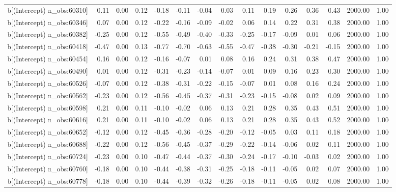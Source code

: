 \begin{table}[ht]
\begin{tabular}{rrrrrrrrrrrrrrr}
  b[(Intercept) n\_obs:60310] & 0.11 & 0.00 & 0.12 & -0.18 & -0.11 & -0.04 & 0.03 & 0.11 & 0.19 & 0.26 & 0.36 & 0.43 & 2000.00 & 1.00 \\ 
  b[(Intercept) n\_obs:60346] & 0.07 & 0.00 & 0.12 & -0.22 & -0.16 & -0.09 & -0.02 & 0.06 & 0.14 & 0.22 & 0.31 & 0.38 & 2000.00 & 1.00 \\ 
  b[(Intercept) n\_obs:60382] & -0.25 & 0.00 & 0.12 & -0.55 & -0.49 & -0.40 & -0.33 & -0.25 & -0.17 & -0.09 & 0.01 & 0.06 & 2000.00 & 1.00 \\ 
  b[(Intercept) n\_obs:60418] & -0.47 & 0.00 & 0.13 & -0.77 & -0.70 & -0.63 & -0.55 & -0.47 & -0.38 & -0.30 & -0.21 & -0.15 & 2000.00 & 1.00 \\ 
  b[(Intercept) n\_obs:60454] & 0.16 & 0.00 & 0.12 & -0.16 & -0.07 & 0.01 & 0.08 & 0.16 & 0.24 & 0.31 & 0.38 & 0.47 & 2000.00 & 1.00 \\ 
  b[(Intercept) n\_obs:60490] & 0.01 & 0.00 & 0.12 & -0.31 & -0.23 & -0.14 & -0.07 & 0.01 & 0.09 & 0.16 & 0.23 & 0.30 & 2000.00 & 1.00 \\ 
  b[(Intercept) n\_obs:60526] & -0.07 & 0.00 & 0.12 & -0.38 & -0.31 & -0.22 & -0.15 & -0.07 & 0.01 & 0.08 & 0.16 & 0.24 & 2000.00 & 1.00 \\ 
  b[(Intercept) n\_obs:60562] & -0.23 & 0.00 & 0.12 & -0.56 & -0.45 & -0.37 & -0.31 & -0.23 & -0.15 & -0.08 & 0.02 & 0.09 & 2000.00 & 1.00 \\ 
  b[(Intercept) n\_obs:60598] & 0.21 & 0.00 & 0.11 & -0.10 & -0.02 & 0.06 & 0.13 & 0.21 & 0.28 & 0.35 & 0.43 & 0.51 & 2000.00 & 1.00 \\ 
  b[(Intercept) n\_obs:60616] & 0.21 & 0.00 & 0.11 & -0.10 & -0.02 & 0.06 & 0.13 & 0.21 & 0.28 & 0.35 & 0.43 & 0.52 & 2000.00 & 1.00 \\ 
  b[(Intercept) n\_obs:60652] & -0.12 & 0.00 & 0.12 & -0.45 & -0.36 & -0.28 & -0.20 & -0.12 & -0.05 & 0.03 & 0.11 & 0.18 & 2000.00 & 1.00 \\ 
  b[(Intercept) n\_obs:60688] & -0.22 & 0.00 & 0.12 & -0.56 & -0.45 & -0.37 & -0.29 & -0.22 & -0.14 & -0.06 & 0.02 & 0.11 & 2000.00 & 1.00 \\ 
  b[(Intercept) n\_obs:60724] & -0.23 & 0.00 & 0.10 & -0.47 & -0.44 & -0.37 & -0.30 & -0.24 & -0.17 & -0.10 & -0.03 & 0.02 & 2000.00 & 1.00 \\ 
  b[(Intercept) n\_obs:60760] & -0.18 & 0.00 & 0.10 & -0.44 & -0.38 & -0.31 & -0.25 & -0.18 & -0.11 & -0.05 & 0.02 & 0.07 & 2000.00 & 1.00 \\ 
  b[(Intercept) n\_obs:60778] & -0.18 & 0.00 & 0.10 & -0.44 & -0.39 & -0.32 & -0.26 & -0.18 & -0.11 & -0.05 & 0.02 & 0.08 & 2000.00 & 1.00 \\ 

\end{tabular}
\end{table}
